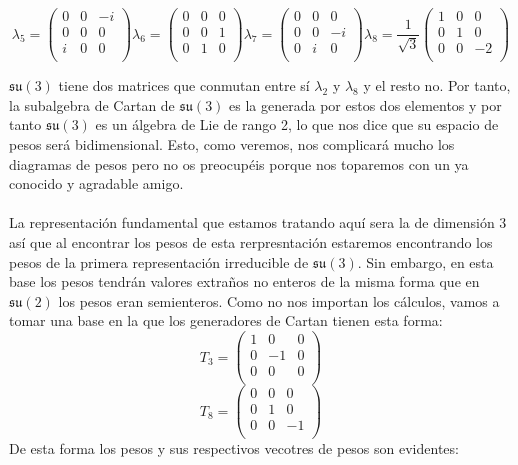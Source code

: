 \documentclass[12pt]{article}
\begin{document}
$$
\lambda_5 =\begin{pmatrix}
    0 & 0 & -i \\ 0 & 0 & 0\\i &0& 0\\
\end{pmatrix}
\lambda_6 =\begin{pmatrix}
    0 & 0 & 0 \\ 0 & 0 & 1\\ 0 &1& 0\\
\end{pmatrix}
\lambda_7 =\begin{pmatrix}
    0 & 0 & 0 \\ 0 & 0 & -i\\ 0 &i& 0\\
\end{pmatrix}
\lambda_8 =\frac{1}{\sqrt{3}}\begin{pmatrix}
    1 & 0 & 0 \\ 0 & 1 & 0\\ 0 &0& -2\\
\end{pmatrix}
$$

$\mathfrak{s}\mathfrak{u}(3)$ tiene dos matrices que conmutan entre sí $\lambda_2$ y $\lambda_8$ y el resto no. Por tanto, la subalgebra de Cartan de $\mathfrak{s}\mathfrak{u}(3)$ es la generada por estos dos elementos y por tanto $\mathfrak{s}\mathfrak{u}(3)$ es un álgebra de Lie de rango 2, lo que nos dice que su espacio de pesos será bidimensional. Esto, como veremos, nos complicará mucho los diagramas de pesos pero no os preocupéis porque nos toparemos con un ya conocido y agradable amigo.\\\\
La representación fundamental que estamos tratando aquí sera la de dimensión $3$ así que al encontrar los pesos de esta rerpresntación estaremos encontrando los pesos de la primera representación irreducible de $\mathfrak{s}\mathfrak{u}(3)$.  Sin embargo, en esta base los pesos tendrán valores extraños no enteros de la misma forma que en $\mathfrak{s}\mathfrak{u}(2)$ los pesos eran semienteros. Como no nos importan los cálculos, vamos a tomar una base en la que los generadores de Cartan tienen esta forma:  \\
$$T_3=\begin{pmatrix}
    1 &0 & 0 \\ 0 & -1 & 0 \\ 0 & 0 & 0\\
\end{pmatrix}$$
$$T_8=\begin{pmatrix}
    0 &0 & 0 \\ 0 & 1 & 0 \\ 0 & 0 & -1\\
\end{pmatrix}$$
De esta forma los pesos y sus respectivos vecotres de pesos son evidentes:
 
\end{document}
